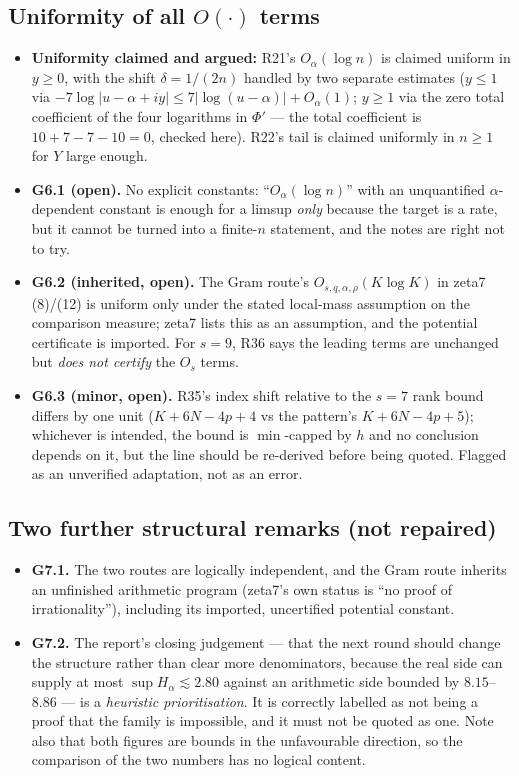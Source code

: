 \documentclass[11pt]{article}
\begin{document}
\subsection{Uniformity of all $O(\cdot)$ terms}
\begin{itemize}[leftmargin=1.4em]
\item \textbf{Uniformity claimed and argued:} R21's $O_\alpha(\log n)$ is claimed uniform in $y\ge0$,
      with the shift $\delta=1/(2n)$ handled by two separate estimates ($y\le1$ via
      $-7\log|u-\alpha+iy|\le7|\log(u-\alpha)|+O_\alpha(1)$; $y\ge1$ via the zero total coefficient of
      the four logarithms in $\Phi'$ --- the total coefficient is $10+7-7-10=0$, checked here).
      R22's tail is claimed uniformly in $n\ge1$ for $Y$ large enough.
\item \textbf{G6.1 (open).} No explicit constants: ``$O_\alpha(\log n)$'' with an unquantified
      $\alpha$-dependent constant is enough for a limsup \emph{only} because the target is a rate, but
      it cannot be turned into a finite-$n$ statement, and the notes are right not to try.
\item \textbf{G6.2 (inherited, open).} The Gram route's $O_{s,q,\alpha,\rho}(K\log K)$ in zeta7 (8)/(12)
      is uniform only under the stated local-mass assumption on the comparison measure; zeta7 lists
      this as an assumption, and the potential certificate is imported. For $s=9$, R36 says the
      leading terms are unchanged but \emph{does not certify} the $O_s$ terms.
\item \textbf{G6.3 (minor, open).} R35's index shift relative to the $s=7$ rank bound differs by one
      unit ($K+6N-4p+4$ vs the pattern's $K+6N-4p+5$); whichever is intended, the bound is
      $\min$-capped by $h$ and no conclusion depends on it, but the line should be re-derived before
      being quoted. Flagged as an unverified adaptation, not as an error.
\end{itemize}

\subsection{Two further structural remarks (not repaired)}
\begin{itemize}[leftmargin=1.4em]
\item \textbf{G7.1.} The two routes are logically independent, and the Gram route inherits an
      unfinished arithmetic program (zeta7's own status is ``no proof of irrationality''), including
      its imported, uncertified potential constant.
\item \textbf{G7.2.} The report's closing judgement --- that the next round should change the structure
      rather than clear more denominators, because the real side can supply at most
      $\sup H_\alpha\lesssim2.80$ against an arithmetic side bounded by $8.15$--$8.86$ --- is a
      \emph{heuristic prioritisation}. It is correctly labelled as not being a proof that the family is
      impossible, and it must not be quoted as one. Note also that both figures are bounds in the
      unfavourable direction, so the comparison of the two numbers has no logical content.
\end{itemize}
\end{document}
